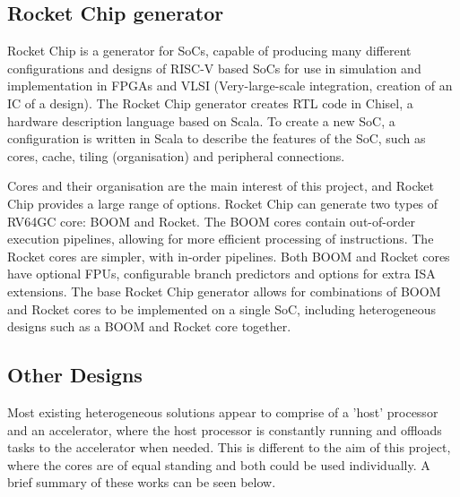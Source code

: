 \documentclass[a4paper,fleqn,11pt]{article}
\begin{document}
\subsection{Rocket Chip generator}
Rocket Chip\cite{rocketchip} is a generator for SoCs, capable of producing many different configurations and designs of RISC-V based SoCs for use in simulation and implementation in FPGAs and VLSI (Very-large-scale integration, creation of an IC of a design). The Rocket Chip generator creates RTL code in Chisel, a hardware description language based on Scala. To create a new SoC, a configuration is written in Scala to describe the features of the SoC, such as cores, cache, tiling (organisation) and peripheral connections. 

Cores and their organisation are the main interest of this project, and Rocket Chip provides a large range of options. Rocket Chip can generate two types of RV64GC core: BOOM\cite{zhaosonicboom} and Rocket. The BOOM cores contain out-of-order execution pipelines, allowing for more efficient processing of instructions. The Rocket cores are simpler, with in-order pipelines. Both BOOM and Rocket cores have optional FPUs, configurable branch predictors and options for extra ISA extensions. The base Rocket Chip generator allows for combinations of BOOM and Rocket cores to be implemented on a single SoC, including heterogeneous designs such as a BOOM and Rocket core together. 

\subsection{Other Designs}
Most existing heterogeneous solutions appear to comprise of a 'host' processor and an accelerator, where the host processor is constantly running and offloads tasks to the accelerator when needed. This is different to the aim of this project, where the cores are of equal standing and both could be used individually. A brief summary of these works can be seen below.
\end{document}
